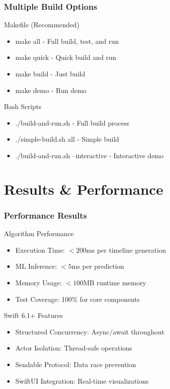 \documentclass[aspectratio=169]{beamer}
\begin{document}
\begin{frame}
    \frametitle{Multiple Build Options}
    \begin{block}{Makefile (Recommended)}
        \begin{itemize}
            \item make all - Full build, test, and run
            \item make quick - Quick build and run
            \item make build - Just build
            \item make demo - Run demo
        \end{itemize}
    \end{block}
    
    \begin{block}{Bash Scripts}
        \begin{itemize}
            \item ./build-and-run.sh - Full build process
            \item ./simple-build.sh all - Simple build
            \item ./build-and-run.sh --interactive - Interactive demo
        \end{itemize}
    \end{block}
\end{frame}

\section{Results \& Performance}

\begin{frame}
    \frametitle{Performance Results}
    \begin{block}{Algorithm Performance}
        \begin{itemize}
            \item Execution Time: $< 200$ms per timeline generation
            \item ML Inference: $< 5$ms per prediction
            \item Memory Usage: $< 100$MB runtime memory
            \item Test Coverage: 100\% for core components
        \end{itemize}
    \end{block}
    
    \begin{block}{Swift 6.1+ Features}
        \begin{itemize}
            \item Structured Concurrency: Async/await throughout
            \item Actor Isolation: Thread-safe operations
            \item Sendable Protocol: Data race prevention
            \item SwiftUI Integration: Real-time visualizations
        \end{itemize}
    \end{block}
\end{frame}
\end{document}
